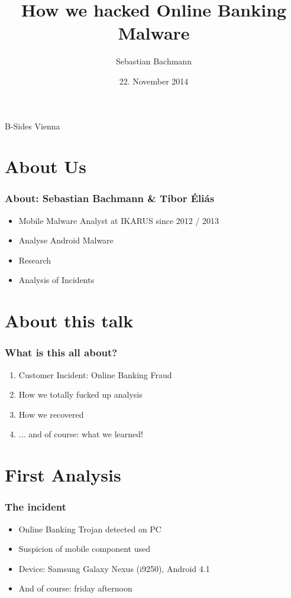 \documentclass[12pt,a4paper]{beamer}
\author{Sebastian Bachmann}
\title{How we hacked Online Banking Malware}
\date{22. November 2014}
\begin{document}
\begin{frame}
    \maketitle
    \centering
    B-Sides Vienna
\end{frame}


\section{About Us}
\begin{frame}
	\frametitle{About: Sebastian Bachmann \& Tibor Éliás}
	\begin{itemize}
		\item Mobile Malware Analyst at IKARUS since 2012 / 2013
		\item Analyse Android Malware
		\item Research
		\item Analysis of Incidents
	\end{itemize}
\end{frame}

\section{About this talk}
\begin{frame}
	\frametitle{What is this all about?}
	\begin{enumerate}
	
		\item Customer Incident: Online Banking Fraud
		\item How we totally fucked up analysis
		\item How we recovered
		\item ... and of course: what we learned!
	\end{enumerate}
\end{frame}


\section{First Analysis}

\begin{frame}
	\frametitle{The incident}
	
	\begin{itemize}
		\item Online Banking Trojan detected on PC
		\item Suspicion of mobile component used
		\item Device: Samsung Galaxy Nexus (i9250), Android 4.1
		\item And of course: friday afternoon
	\end{itemize}

\end{frame}
\end{document}
